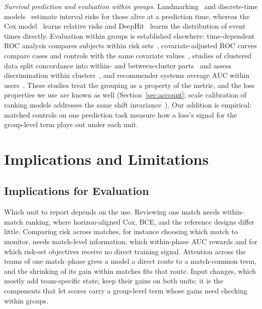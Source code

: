 \documentclass[sigconf,anonymous]{acmart}
\begin{document}
\emph{Survival prediction and evaluation within groups.} Landmarking~\cite{vanHouwelingen07} and discrete-time models~\cite{SingerWillett93,Gensheimer19} estimate interval risks for those alive at a prediction time, whereas the Cox model~\cite{Cox72} learns relative risks and DeepHit~\cite{DeepHit18,DynamicDeepHit20} learns the distribution of event times directly. Evaluation within groups is established elsewhere: time-dependent ROC analysis compares subjects within risk sets~\cite{HeagertyZheng05}, covariate-adjusted ROC curves compare cases and controls with the same covariate values~\cite{JanesPepe09}, studies of clustered data split concordance into within- and between-cluster parts~\cite{vanOirbeek10} and assess discrimination within clusters~\cite{vanKlaveren14}, and recommender systems average AUC within users~\cite{Zhou18}. These studies treat the grouping as a property of the metric, and the loss properties we use are known as well (Section~\ref{sec:account}; scale calibration of ranking models addresses the same shift invariance~\cite{Yan22}). Our addition is empirical: matched controls on one prediction task measure how a loss's signal for the group-level term plays out under each unit.

\section{Implications and Limitations}
\label{sec:discussion}
\subsection{Implications for Evaluation}
\label{sec:discussion:implications}
Which unit to report depends on the use. Reviewing one match needs within-match ranking, where horizon-aligned Cox, BCE, and the reference designs differ little. Comparing risk across matches, for instance choosing which match to monitor, needs match-level information, which within-phase AUC rewards and for which risk-set objectives receive no direct training signal. Attention across the teams of one match--phase gives a model a direct route to a match-common term, and the shrinking of its gain within matches fits that route. Input changes, which mostly add team-specific state, keep their gains on both units; it is the components that let scores carry a group-level term whose gains need checking within groups.
\end{document}

